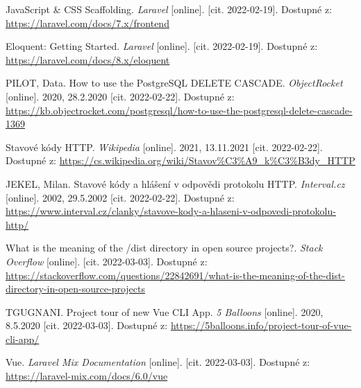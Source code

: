 \begin{thebibliography}{55}
JavaScript \& CSS Scaffolding. \textit{Laravel} [online]. [cit. 2022-02-19]. Dostupné z: \url{https://laravel.com/docs/7.x/frontend}

Eloquent: Getting Started. \textit{Laravel} [online]. [cit. 2022-02-19]. Dostupné z: \url{https://laravel.com/docs/8.x/eloquent}

PILOT, Data. How to use the PostgreSQL DELETE CASCADE. \textit{ObjectRocket} [online]. 2020, 28.2.2020 [cit. 2022-02-22]. Dostupné z: \url{https://kb.objectrocket.com/postgresql/how-to-use-the-postgresql-delete-cascade-1369}

Stavové kódy HTTP. \textit{Wikipedia} [online]. 2021, 13.11.2021 [cit. 2022-02-22]. Dostupné z: \url{https://cs.wikipedia.org/wiki/Stavov%C3%A9\_k%C3%B3dy\_HTTP}

JEKEL, Milan. Stavové kódy a hlášení v odpovědi protokolu HTTP. \textit{Interval.cz} [online]. 2002, 29.5.2002 [cit. 2022-02-22]. Dostupné z: \url{https://www.interval.cz/clanky/stavove-kody-a-hlaseni-v-odpovedi-protokolu-http/}

What is the meaning of the /dist directory in open source projects?. \textit{Stack Overflow} [online]. [cit. 2022-03-03]. Dostupné z: \url{https://stackoverflow.com/questions/22842691/what-is-the-meaning-of-the-dist-directory-in-open-source-projects}

TGUGNANI. Project tour of new Vue CLI App. \textit{5 Balloons} [online]. 2020, 8.5.2020 [cit. 2022-03-03]. Dostupné z: \url{https://5balloons.info/project-tour-of-vue-cli-app/}

Vue. \textit{Laravel Mix Documentation} [online]. [cit. 2022-03-03]. Dostupné z: \url{https://laravel-mix.com/docs/6.0/vue}

\end{thebibliography}